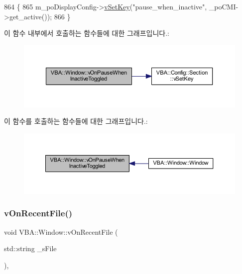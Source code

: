 \begin{DoxyCode}
864 \{
865   m\_poDisplayConfig->\mbox{\hyperlink{class_v_b_a_1_1_config_1_1_section_a57e1b95cbea40db71c093381beff4b0e}{vSetKey}}(\textcolor{stringliteral}{"pause\_when\_inactive"}, \_poCMI->get\_active());
866 \}
\end{DoxyCode}
이 함수 내부에서 호출하는 함수들에 대한 그래프입니다.\+:
\nopagebreak
\begin{figure}[H]
\begin{center}
\leavevmode
\includegraphics[width=350pt]{class_v_b_a_1_1_window_aec8ba72231d668912f3b71353925f2f2_cgraph}
\end{center}
\end{figure}
이 함수를 호출하는 함수들에 대한 그래프입니다.\+:
\nopagebreak
\begin{figure}[H]
\begin{center}
\leavevmode
\includegraphics[width=350pt]{class_v_b_a_1_1_window_aec8ba72231d668912f3b71353925f2f2_icgraph}
\end{center}
\end{figure}
\mbox{\label{class_v_b_a_1_1_window_ab96850739fb7f53a370e6b6f059b87a9}} 
\subsubsection{\texorpdfstring{v\+On\+Recent\+File()}{vOnRecentFile()}}
{\footnotesize\ttfamily void V\+B\+A\+::\+Window\+::v\+On\+Recent\+File (\begin{DoxyParamCaption}\item[{std\+::string}]{\+\_\+s\+File }\end{DoxyParamCaption})\hspace{0.3cm}{\ttfamily [protected]}, {\ttfamily [virtual]}}



